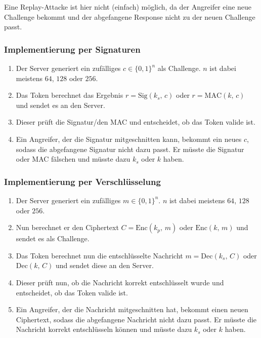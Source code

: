 \documentclass[a4paper, 11pt, accentcolor = tud3b]{tudreport}
\newcommand{\Enc}{\ensuremath{\textrm{Enc}}}
\newcommand{\Dec}{\ensuremath{\textrm{Dec}}}
\newcommand{\Sig}{\ensuremath{\textrm{Sig}}}
\newcommand{\MAC}{\ensuremath{\textrm{MAC}}}
\begin{document}
                Eine Replay-Attacke ist hier nicht (einfach) möglich, da der Angreifer eine neue Challenge bekommt und der abgefangene Response nicht zu der neuen Challenge passt.

	            \subsubsection{Implementierung per Signaturen}
		            \begin{enumerate}
		            	\item Der Server generiert ein zufälliges \( c \in \{0,1\}^n \) als Challenge. \(n\) ist dabei meistens \(64\), \(128\) oder \(256\).
		            	\item Das Token berechnet das Ergebnis \( r = \Sig(k_s,\, c) \) oder \( r = \MAC(k,\, c) \) und sendet es an den Server.
		            	\item Dieser prüft die Signatur/den MAC und entscheidet, ob das Token valide ist.
		            	\item Ein Angreifer, der die Signatur mitgeschnitten kann, bekommt ein neues \(c\), sodass die abgefangene Signatur nicht dazu passt. Er müsste die Signatur oder MAC fälschen und müsste dazu \(k_s\) oder \(k\) haben.
		            \end{enumerate}
	
	            \subsubsection{Implementierung per Verschlüsselung}
	                \begin{enumerate}
	                	\item Der Server generiert ein zufälliges \(m \in \{0,1\}^n\). \(n\) ist dabei meistens \(64\), \(128\) oder \(256\).
	                	\item Nun berechnet er den Ciphertext \( C = \Enc(k_p,\, m) \) oder \( \Enc(k,\, m) \) und sendet es als Challenge.
	                	\item Das Token berechnet nun die entschlüsselte Nachricht \( m = \Dec(k_s,\, C) \) oder \( \Dec(k,\, C) \) und sendet diese an den Server.
	                	\item Dieser prüft nun, ob die Nachricht korrekt entschlüsselt wurde und entscheidet, ob das Token valide ist.
	                	\item Ein Angreifer, der die Nachricht mitgeschnitten hat, bekommt einen neuen Ciphertext, sodass die abgefangene Nachricht nicht dazu passt. Er müsste die Nachricht korrekt entschlüsseln können und müsste dazu \(k_s\) oder \(k\) haben.
	                \end{enumerate}
	            
\end{document}
